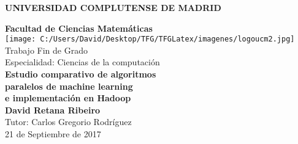 
\begin{titlepage}
  \begin{center}
    \vspace*{1cm}
    \Huge
    \textbf{UNIVERSIDAD COMPLUTENSE DE MADRID}\\
    \vspace{0.8cm}
    \LARGE

    \textbf{Facultad de Ciencias Matemáticas}\\
    \vspace{0.5cm}
    \vspace{0.5cm} 
    \texttt{[image: C:/Users/David/Desktop/TFG/TFGLatex/imagenes/logoucm2.jpg]} \\

    Trabajo Fin de Grado\\
    Especialidad: Ciencias de la computación\\
    \vspace{0.8cm}
    \Huge
    \textbf{Estudio comparativo de algoritmos}\\
    \textbf{paralelos de machine learning}\\
    \textbf{e implementación en Hadoop}\\
    \vfill
    \LARGE
    \vspace{1cm}
    \textbf{David Retana Ribeiro}\\
    \vspace{0.5cm}
    Tutor: Carlos Gregorio Rodríguez\\
    \vspace{0.5cm}
    \Large
    21 de Septiembre de 2017 
  \end{center}
\end{titlepage}


